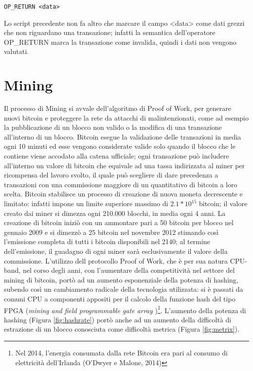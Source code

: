 \begin{lstlisting}[language=bitcoinscript, label={code:nulldata}, caption={Uso dell'operatore OP\_RETURN.}]
OP_RETURN <data>
\end{lstlisting}

Lo script precedente non fa altro che marcare il campo <data> come dati grezzi che non riguardano una transazione; infatti la semantica dell’operatore OP\_RETURN marca la transazione come invalida, quindi i dati non vengono valutati.
\newpage
\section{Mining}
\label{sec:miningbitcoin}

Il processo di Mining si avvale dell’algoritmo di Proof of Work, per generare nuovi bitcoin e proteggere la rete da attacchi di malintenzionati, come ad esempio la pubblicazione di un blocco non valido o la modifica di una transazione all’interno di un blocco.\newline
Bitcoin esegue la validazione delle transazioni in media ogni 10 minuti ed esse vengono considerate valide solo quando il blocco che le contiene viene accodato alla catena ufficiale; ogni transazione può includere all’interno un valore di bitcoin che equivale ad una tassa indirizzata al miner per ricompensa del lavoro svolto, il quale può scegliere di dare precedenza a transazioni con una commissione maggiore di un quantitativo di bitcoin a loro scelta.\newline
Bitcoin stabilisce un processo di creazione di nuova moneta decrescente e limitato: infatti impone un limite superiore massimo di \(2.1 * 10^{15} \) bitcoin; il valore creato dai miner si dimezza ogni 210.000 blocchi, in media ogni 4 anni.
La creazione di bitcoin iniziò con un ammontare pari a 50 bitcoin per blocco nel gennaio 2009 e si dimezzò a 25 bitcoin nel novembre 2012 stimando così l’emissione completa di tutti i bitcoin disponibili nel 2140; al termine dell’emissione, il guadagno di ogni miner sarà esclusivamente il valore della commissione.
L’utilizzo dell protocollo Proof of Work, che è per sua natura CPU-band, nel corso degli anni, con l’aumentare della competitività nel settore del mining di bitcoin, portò ad un aumento esponenziale della potenza di hashing, subendo così un cambiamento radicale della tecnologia utilizzata: si è passati da comuni CPU a componenti appositi per il calcolo della funzione hash del tipo FPGA ({\it mining and field programmable gate array \/})\footnote{Nel 2014, l'energia consumata dalla rete Bitcoin era pari al consumo di elettricità dell'Irlanda (O'Dwyer e Malone, 2014)}.
L’aumento della potenza di hashing (Figura \ref{fig:hashrate}) portò anche ad un aumento della difficoltà di estrazione di un blocco conosciuta come difficoltà metrica (Figura \ref{fig:metrix}).

